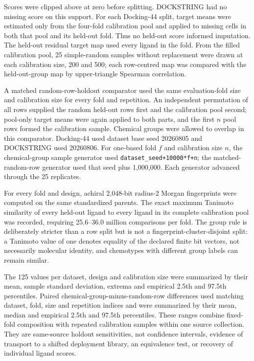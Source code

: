 Scores were clipped above at zero before splitting.  DOCKSTRING had no missing
score on this support.  For each Docking-44 split, target means were estimated
only from the four-fold calibration pool and applied to missing cells in both
that pool and its held-out fold.  Thus no held-out score informed imputation.
The held-out residual target map used every ligand in the fold.  From the
filled calibration pool, 25 simple-random samples without replacement were
drawn at each calibration size, 200 and 500; each row-centred map was compared
with the held-out-group map by upper-triangle Spearman correlation.

A matched random-row-holdout comparator used the same evaluation-fold size and
calibration size for every fold and repetition.  An independent permutation of
all rows supplied the random held-out rows first and the calibration pool
second; pool-only target means were again applied to both parts, and the first
$n$ pool rows formed the calibration sample.  Chemical groups were allowed to
overlap in this comparator.  Docking-44 used dataset base seed 20260805 and
DOCKSTRING used 20260806.  For one-based fold $f$ and calibration size $n$, the
chemical-group sample generator used
\texttt{dataset\_seed+10000*f+n}; the matched-random-row generator used that
seed plus 1,000,000.  Each generator advanced through the 25 replicates.

For every fold and design, achiral 2,048-bit radius-2 Morgan fingerprints were
computed on the same standardized parents.  The exact maximum Tanimoto
similarity of every held-out ligand to every ligand in its complete calibration
pool was recorded, requiring 25.6--36.0 million comparisons per fold.  The
group rule is deliberately stricter than a row split but is not a
fingerprint-cluster-disjoint split: a Tanimoto value of one denotes equality of
the declared finite bit vectors, not necessarily molecular identity, and
chemotypes with different group labels can remain similar.

The 125 values per dataset, design and calibration size were summarized by
their mean, sample standard deviation, extrema and empirical 2.5th and 97.5th
percentiles.  Paired chemical-group-minus-random-row differences used matching
dataset, fold, size and repetition indices and were summarized by their mean,
median and empirical 2.5th and 97.5th percentiles.  These ranges combine fixed-
fold composition with repeated calibration samples within one source
collection.  They are same-source holdout sensitivities, not confidence
intervals, evidence of transport to a shifted deployment library, an
equivalence test, or recovery of individual ligand scores.

